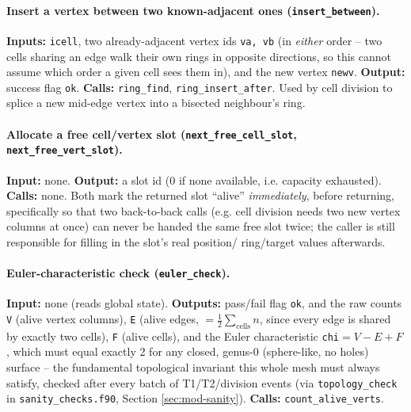 \documentclass[11pt,a4paper]{report}
\begin{document}
\paragraph{Insert a vertex between two known-adjacent ones
(\texttt{insert\_between}).} \textbf{Inputs:} \texttt{icell}, two
already-adjacent vertex ids \texttt{va, vb} (in \emph{either} order --
two cells sharing an edge walk their own rings in opposite directions,
so this cannot assume which order a given cell sees them in), and the
new vertex \texttt{newv}. \textbf{Output:} success flag \texttt{ok}.
\textbf{Calls:} \texttt{ring\_find}, \texttt{ring\_insert\_after}. Used
by cell division to splice a new mid-edge vertex into a bisected
neighbour's ring.
\paragraph{Allocate a free cell/vertex slot (\texttt{next\_free\_cell\_slot},
\texttt{next\_free\_vert\_slot}).} \textbf{Input:} none.
\textbf{Output:} a slot id (0 if none available, i.e. capacity
exhausted). \textbf{Calls:} none. Both mark the returned slot
``alive'' \emph{immediately}, before returning, specifically so that
two back-to-back calls (e.g. cell division needs two new vertex
columns at once) can never be handed the same free slot twice; the
caller is still responsible for filling in the slot's real position/
ring/target values afterwards.
\paragraph{Euler-characteristic check (\texttt{euler\_check}).}
\textbf{Input:} none (reads global state). \textbf{Outputs:} pass/fail
flag \texttt{ok}, and the raw counts \texttt{V} (alive vertex columns),
\texttt{E} (alive edges, $=\tfrac12\sum_{\text{cells}} n$, since every
edge is shared by exactly two cells), \texttt{F} (alive cells), and the
Euler characteristic \texttt{chi}$=V-E+F$, which must equal exactly 2
for any closed, genus-0 (sphere-like, no holes) surface -- the
fundamental topological invariant this whole mesh must always satisfy,
checked after every batch of T1/T2/division events (via
\texttt{topology\_check} in \texttt{sanity\_checks.f90}, Section
\ref{sec:mod-sanity}). \textbf{Calls:} \texttt{count\_alive\_verts}.
\end{document}
